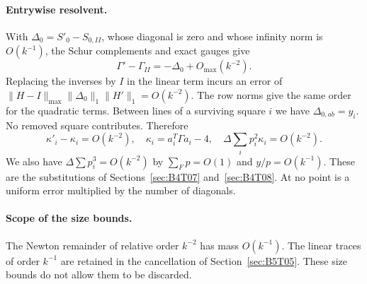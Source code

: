 \paragraph{Entrywise resolvent.}
With $\Delta_0=S'_{0}-S_{0,II}$, whose diagonal is zero and whose infinity norm is $O(k^{-1})$,
the Schur complements and exact gauges give
\[
 \Gamma'-\Gamma_{II}=-\Delta_0+O_{\max}(k^{-2}).
\]
Replacing the inverses by $I$ in the linear term incurs an error of
$\|H-I\|_{\max}\|\Delta_0\|_1\|H'\|_1=O(k^{-2})$.
The row norms give the same order for the quadratic terms.
Between lines of a surviving square $i$ we have $\Delta_{0,ab}=y_i$.
No removed square contributes. Therefore
\[
 \kappa'_i-\kappa_i=O(k^{-2}),\quad
 \kappa_i=a_i^T\Gamma a_i-4,
 \quad\Delta\sum_i p_i^2\kappa_i=O(k^{-2}).
\]
We also have $\Delta\sum p_i^3=O(k^{-2})$ by $\sum_Fp=O(1)$ and $y/p=O(k^{-1})$.
These are the substitutions of Sections~\ref{sec:B4T07} and~\ref{sec:B4T08}. At no point is a uniform error
multiplied by the number of diagonals.

\paragraph{Scope of the size bounds.}
The Newton remainder of relative order $k^{-2}$ has mass $O(k^{-1})$.
The linear traces of order $k^{-1}$ are retained in the cancellation of Section~\ref{sec:B5T05}.
These size bounds do not allow them to be discarded.
